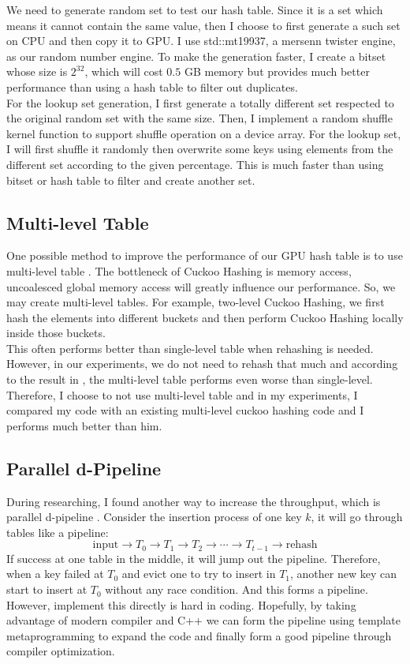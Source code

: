 \documentclass[10pt,twocolumn,letterpaper]{article}
\begin{document}
We need to generate random set to test our hash table. Since it is a set which means it cannot contain the same value, then I choose to first generate a such set on CPU and then copy it to GPU. I use std::mt19937, a mersenn twister engine, as our random number engine. To make the generation faster, I create a bitset whose size is $2^{32}$, which will cost $0.5$ GB memory but provides much better performance than using a hash table to filter out duplicates. \\
For the lookup set generation, I first generate a totally different set respected to the original random set with the same size. Then, I implement a random shuffle kernel function to support shuffle operation on a device array. For the lookup set, I will first shuffle it randomly then overwrite some keys using elements from the different set according to the given percentage. This is much faster than using bitset or hash table to filter and create another set.

\subsection{Multi-level Table}

One possible method to improve the performance of our GPU hash table is to use multi-level table \cite{analysinghashtable}. The bottleneck of Cuckoo Hashing is memory access, uncoalesced global memory access will greatly influence our performance. So, we may create multi-level tables. For example, two-level Cuckoo Hashing, we first hash the elements into different buckets and then perform Cuckoo Hashing locally inside those buckets.\\
This often performs better than single-level table when rehashing is needed. However, in our experiments, we do not need to rehash that much and according to the result in \cite{analysinghashtable}, the multi-level table performs even worse than single-level. Therefore, I choose to not use multi-level table and in my experiments, I compared my code with an existing multi-level cuckoo hashing code and I performs much better than him.

\subsection{Parallel d-Pipeline}

During researching, I found another way to increase the throughput, which is parallel d-pipeline \cite{7070722}. Consider the insertion process of one key $k$, it will go through tables like a pipeline:
$$\text{input} \rightarrow T_0 \rightarrow T_1 \rightarrow T_2 \rightarrow \cdots \rightarrow T_{t - 1} \rightarrow \text{rehash}$$
If success at one table in the middle, it will jump out the pipeline. Therefore, when a key failed at $T_0$ and evict one to try to insert in $T_1$, another new key can start to insert at $T_0$ without any race condition. And this forms a pipeline.\\
However, implement this directly is hard in coding. Hopefully, by taking advantage of modern compiler and C++ we can form the pipeline using template metaprogramming to expand the code and finally form a good pipeline through compiler optimization.
\end{document}
